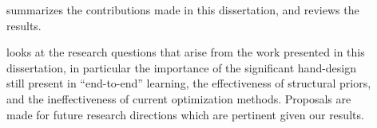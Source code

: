 \documentclass[thesis]{subfiles}
\begin{document}
\begin{description}
	\item[] summarizes the contributions made in this dissertation, and reviews the results.
	
	\item[] looks at the research questions that arise from the work presented in this dissertation, in particular the importance of the significant hand-design still present in ``end-to-end'' learning, the effectiveness of structural priors, and the ineffectiveness of current optimization methods. Proposals are made for future research directions which are pertinent given our results.
	
\end{description}
\end{document}

